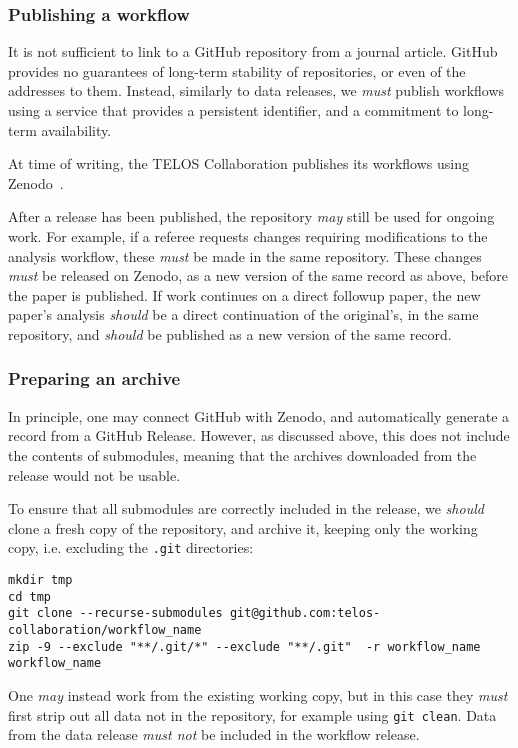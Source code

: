 \documentclass{article}
\newcommand\rfcword[1]{\emph{#1}\xspace}
\newcommand\must{\rfcword{must}}
\newcommand\mustnot{\rfcword{must not}}
\newcommand\should{\rfcword{should}}
\newcommand\may{\rfcword{may}}
\newcommand\filename[1]{\texttt{#1}\xspace}
\begin{document}
\subsubsection{Publishing a workflow}

It is not sufficient to link to a GitHub repository from a journal article.
GitHub provides no guarantees of long-term stability of repositories,
or even of the addresses to them.
Instead,
similarly to data releases,
we \must publish workflows using a service that provides a persistent identifier,
and a commitment to long-term availability.

At time of writing,
the TELOS Collaboration publishes its workflows using Zenodo~\cite{zenodo}.

After a release has been published,
the repository \may still be used for ongoing work.
For example,
if a referee requests changes requiring modifications to the analysis workflow,
these \must be made in the same repository.
These changes \must be released on Zenodo,
as a new version of the same record as above,
before the paper is published.
If work continues on a direct followup paper,
the new paper's analysis \should be a direct continuation of the original's,
in the same repository,
and \should be published as a new version of the same record.

\subsubsection{Preparing an archive}

In principle,
one may connect GitHub with Zenodo,
and automatically generate a record from a GitHub Release.
However,
as discussed above,
this does not include the contents of submodules,
meaning that the archives downloaded from the release would not be usable.

To ensure that all submodules are correctly included in the release,
we \should clone a fresh copy of the repository,
and archive it,
keeping only the working copy,
i.e. excluding the \filename{.git} directories:

\begin{verbatim}
mkdir tmp
cd tmp
git clone --recurse-submodules git@github.com:telos-collaboration/workflow_name
zip -9 --exclude "**/.git/*" --exclude "**/.git"  -r workflow_name workflow_name
\end{verbatim}

One \may instead work from the existing working copy,
but in this case they \must first strip out all data not in the repository,
for example using \verb|git clean|.
Data from the data release \mustnot be included in the workflow release.
\end{document}
